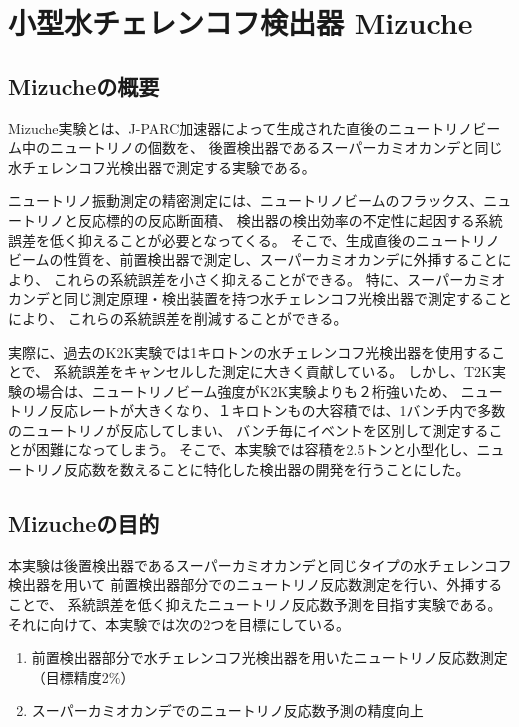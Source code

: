 \chapter{小型水チェレンコフ検出器 Mizuche}

\section{Mizucheの概要}

Mizuche実験とは、J-PARC加速器によって生成された直後のニュートリノビーム中のニュートリノの個数を、
後置検出器であるスーパーカミオカンデと同じ水チェレンコフ光検出器で測定する実験である。

ニュートリノ振動測定の精密測定には、ニュートリノビームのフラックス、ニュートリノと反応標的の反応断面積、
検出器の検出効率の不定性に起因する系統誤差を低く抑えることが必要となってくる。
そこで、生成直後のニュートリノビームの性質を、前置検出器で測定し、スーパーカミオカンデに外挿することにより、
これらの系統誤差を小さく抑えることができる。
特に、スーパーカミオカンデと同じ測定原理・検出装置を持つ水チェレンコフ光検出器で測定することにより、
これらの系統誤差を削減することができる。

実際に、過去のK2K実験では1キロトンの水チェレンコフ光検出器を使用することで、
系統誤差をキャンセルした測定に大きく貢献している。
しかし、T2K実験の場合は、ニュートリノビーム強度がK2K実験よりも２桁強いため、
ニュートリノ反応レートが大きくなり、１キロトンもの大容積では、1バンチ内で多数のニュートリノが反応してしまい、
バンチ毎にイベントを区別して測定することが困難になってしまう。
そこで、本実験では容積を2.5トンと小型化し、ニュートリノ反応数を数えることに特化した検出器の開発を行うことにした。

\section{Mizucheの目的}

本実験は後置検出器であるスーパーカミオカンデと同じタイプの水チェレンコフ検出器を用いて
前置検出器部分でのニュートリノ反応数測定を行い、外挿することで、
系統誤差を低く抑えたニュートリノ反応数予測を目指す実験である。
それに向けて、本実験では次の2つを目標にしている。

\begin{enumerate}
\item 前置検出器部分で水チェレンコフ光検出器を用いたニュートリノ反応数測定\\（目標精度2\%）
\item スーパーカミオカンデでのニュートリノ反応数予測の精度向上
\end{enumerate}

